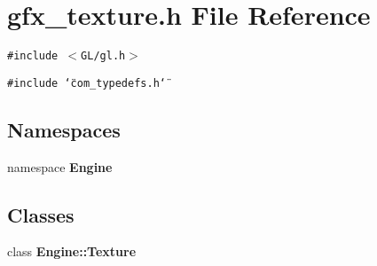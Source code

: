 \section{gfx\_\-texture.h File Reference}
\label{gfx__texture_8h}
{\tt \#include $<$GL/gl.h$>$}\par
{\tt \#include \char`\"{}com\_\-typedefs.h\char`\"{}}\par
\subsection*{Namespaces}
\begin{CompactItemize}
\item 
namespace {\bf Engine}
\end{CompactItemize}
\subsection*{Classes}
\begin{CompactItemize}
\item 
class {\bf Engine::Texture}
\end{CompactItemize}
